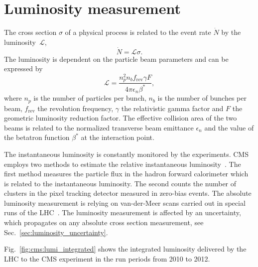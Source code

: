\section{Luminosity measurement}
\label{sec:lumi_measurement}

The cross section $\sigma$ of a physical process is related to the
event rate $\dot{N}$ by the luminosity~$\mathcal{L}$,
%
\begin{equation*}
    \dot{N} = \mathcal{L} \sigma.
\end{equation*}
%
The luminosity is dependent on the particle beam parameters and can be expressed
by
%
\begin{equation*}
    \mathcal{L} = \frac{n_p^2
        n_b f_\mathrm{rev} \gamma F}{4 \pi \epsilon_n \beta^*},
\end{equation*}
%
where $n_p$ is the number of particles per bunch, $n_b$ is the number of bunches
per beam, $f_\mathrm{rev}$ the revolution frequency, $\gamma$ the relativistic
gamma factor and $F$ the geometric luminosity reduction factor. The effective
collision area of the two beams is related to the normalized transverse beam
emittance $\epsilon_n$ and the value of the betatron function $\beta^*$ at the
interaction point.

The instantaneous luminosity is constantly monitored by the experiments. CMS
employs two methods to estimate the relative instantaneous
luminosity~\cite{CMS-PAS-LUM-13-001}. The first method measures the particle
flux in the hadron forward calorimeter which is related to the instantaneous
luminosity. The second counts the number of clusters in the pixel tracking
detector measured in zero-bias events. The absolute luminosity measurement is
relying on van-der-Meer scans carried out in special runs of the
LHC~\cite{vanderMeer:296752}. The luminosity measurement is affected by an
uncertainty, which propagates on any absolute cross section measurement, see
Sec.~\ref{sec:luminosity_uncertainty}.

Fig.~\ref{fig:cms:lumi_integrated} shows the integrated luminosity delivered by
the LHC to the CMS experiment in the run periods from 2010 to 2012.

